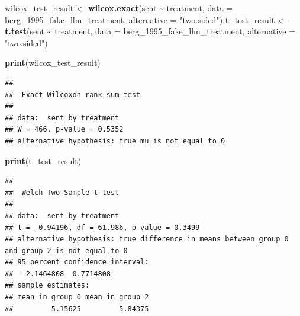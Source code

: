 \documentclass[
]{article}
\newenvironment{Shaded}{\begin{snugshade}}{\end{snugshade}}
\newcommand{\AttributeTok}[1]{\textcolor[rgb]{0.13,0.29,0.53}{#1}}
\newcommand{\FunctionTok}[1]{\textcolor[rgb]{0.13,0.29,0.53}{\textbf{#1}}}
\newcommand{\NormalTok}[1]{#1}
\newcommand{\OtherTok}[1]{\textcolor[rgb]{0.56,0.35,0.01}{#1}}
\newcommand{\SpecialCharTok}[1]{\textcolor[rgb]{0.81,0.36,0.00}{\textbf{#1}}}
\newcommand{\StringTok}[1]{\textcolor[rgb]{0.31,0.60,0.02}{#1}}
\begin{document}
\begin{Shaded}
\begin{Highlighting}[]
\NormalTok{wilcox\_test\_result }\OtherTok{\textless{}{-}} \FunctionTok{wilcox.exact}\NormalTok{(sent }\SpecialCharTok{\textasciitilde{}}\NormalTok{ treatment, }\AttributeTok{data =}\NormalTok{ berg\_1995\_fake\_llm\_treatment, }\AttributeTok{alternative =} \StringTok{"two.sided"}\NormalTok{)}
\NormalTok{t\_test\_result }\OtherTok{\textless{}{-}} \FunctionTok{t.test}\NormalTok{(sent }\SpecialCharTok{\textasciitilde{}}\NormalTok{ treatment, }\AttributeTok{data =}\NormalTok{ berg\_1995\_fake\_llm\_treatment, }\AttributeTok{alternative =} \StringTok{"two.sided"}\NormalTok{)}

\FunctionTok{print}\NormalTok{(wilcox\_test\_result)}
\end{Highlighting}
\end{Shaded}

\begin{verbatim}
## 
##  Exact Wilcoxon rank sum test
## 
## data:  sent by treatment
## W = 466, p-value = 0.5352
## alternative hypothesis: true mu is not equal to 0
\end{verbatim}

\begin{Shaded}
\begin{Highlighting}[]
\FunctionTok{print}\NormalTok{(t\_test\_result)}
\end{Highlighting}
\end{Shaded}

\begin{verbatim}
## 
##  Welch Two Sample t-test
## 
## data:  sent by treatment
## t = -0.94196, df = 61.986, p-value = 0.3499
## alternative hypothesis: true difference in means between group 0 and group 2 is not equal to 0
## 95 percent confidence interval:
##  -2.1464808  0.7714808
## sample estimates:
## mean in group 0 mean in group 2 
##         5.15625         5.84375
\end{verbatim}
\end{document}
